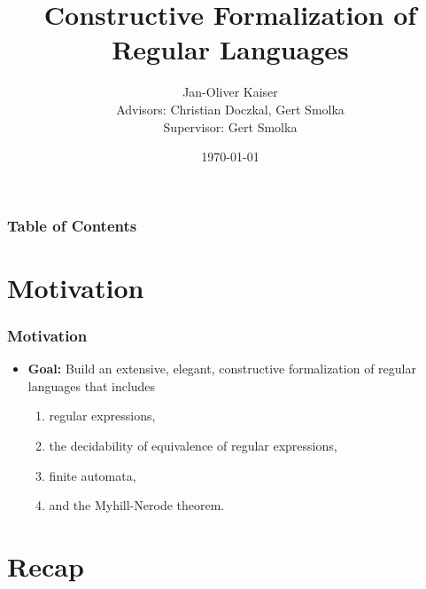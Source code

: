 \documentclass{beamer}
\begin{document}
\title[Constr. Formalization of Reg. Languages]{Constructive Formalization of Regular Languages}  
\author[Jan-Oliver Kaiser]{Jan-Oliver Kaiser \\{\small Advisors: Christian Doczkal, Gert Smolka }\\{\small Supervisor: Gert Smolka}}
\institute{ }

\date{\today} 


\begin{frame}
    \titlepage
\end{frame}

\begin{frame}
    \frametitle{Table of Contents}
    \tableofcontents
\end{frame}

\section{Motivation}
\begin{frame}
    \frametitle{Motivation}
    \begin{itemize}
        \item \textbf{Goal:} Build an extensive, elegant, constructive formalization of regular languages that includes 
            \begin{enumerate}
                \item regular expressions, 
                \item the decidability of equivalence of regular expressions,
                \item finite automata, 
                \item and the Myhill-Nerode theorem.
            \end{enumerate}
    \end{itemize}
\end{frame}



\section{Recap}
\end{document}
